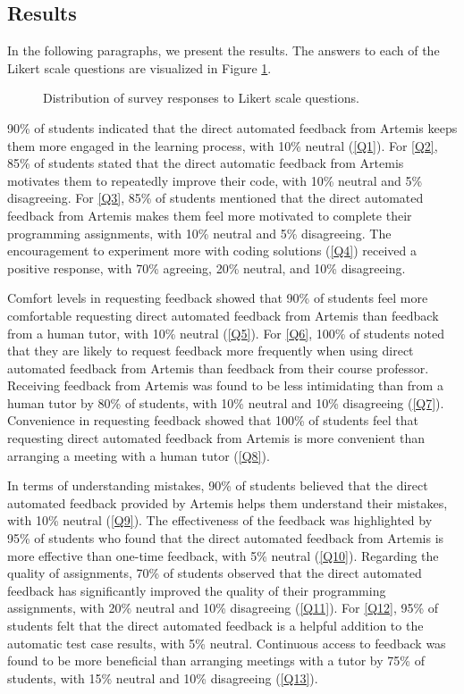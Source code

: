 \documentclass[manuscript,screen,review]{acmart}
\begin{document}
\subsection{Results}

In the following paragraphs, we present the results. 
The answers to each of the Likert scale questions are visualized in Figure \ref{fig:Survey-Results}.

\begin{figure}[htpb]
  \centering
  \resizebox{0.8\textwidth}{!}{
    
  }
  \caption{Distribution of survey responses to Likert scale questions.}
  \label{fig:Survey-Results}
\end{figure}


90\% of students indicated that the direct automated feedback from Artemis keeps them more engaged in the learning process, with 10\% neutral (\ref{Q1}).
For \ref{Q2}, 85\% of students stated that the direct automatic feedback from Artemis motivates them to repeatedly improve their code, with 10\% neutral and 5\% disagreeing.
For \ref{Q3}, 85\% of students mentioned that the direct automated feedback from Artemis makes them feel more motivated to complete their programming assignments, with 10\% neutral and 5\% disagreeing.
The encouragement to experiment more with coding solutions (\ref{Q4}) received a positive response, with 70\% agreeing, 20\% neutral, and 10\% disagreeing.


Comfort levels in requesting feedback showed that 90\% of students feel more comfortable requesting direct automated feedback from Artemis than feedback from a human tutor, with 10\% neutral (\ref{Q5}).
For \ref{Q6}, 100\% of students noted that they are likely to request feedback more frequently when using direct automated feedback from Artemis than feedback from their course professor.
Receiving feedback from Artemis was found to be less intimidating than from a human tutor by 80\% of students, with 10\% neutral and 10\% disagreeing (\ref{Q7}).
Convenience in requesting feedback showed that 100\% of students feel that requesting direct automated feedback from Artemis is more convenient than arranging a meeting with a human tutor (\ref{Q8}).


In terms of understanding mistakes, 90\% of students believed that the direct automated feedback provided by Artemis helps them understand their mistakes, with 10\% neutral (\ref{Q9}).
The effectiveness of the feedback was highlighted by 95\% of students who found that the direct automated feedback from Artemis is more effective than one-time feedback, with 5\% neutral (\ref{Q10}).
Regarding the quality of assignments, 70\% of students observed that the direct automated feedback has significantly improved the quality of their programming assignments, with 20\% neutral and 10\% disagreeing (\ref{Q11}).
For \ref{Q12}, 95\% of students felt that the direct automated feedback is a helpful addition to the automatic test case results, with 5\% neutral.
Continuous access to feedback was found to be more beneficial than arranging meetings with a tutor by 75\% of students, with 15\% neutral and 10\% disagreeing (\ref{Q13}).
\end{document}
